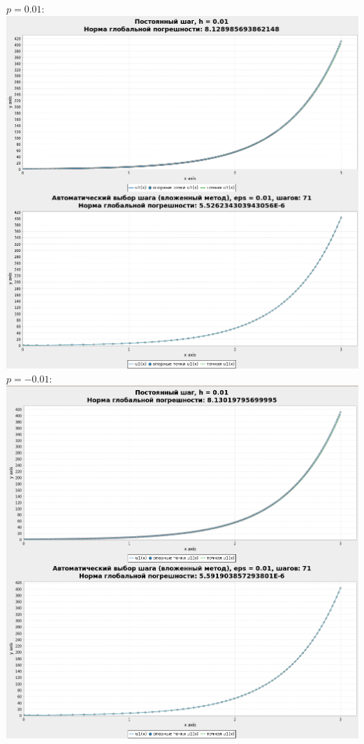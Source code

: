 \documentclass[a4paper,12pt]{article}
\begin{document}
\begin{flushleft}
\begin{enumerate}
      $p = 0.01:$\linebreak\linebreak\includegraphics{xp0_01.png}\linebreak\linebreak
      $p = -0.01:$\linebreak\linebreak\includegraphics{xpm0_01.png}\linebreak\linebreak

\end{enumerate}
\end{flushleft}
\end{document}
